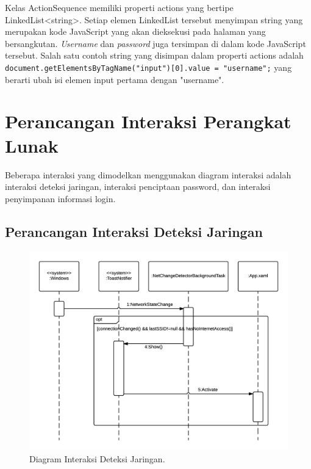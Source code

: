 Kelas ActionSequence memiliki properti actions yang bertipe LinkedList<string>. Setiap elemen LinkedList tersebut menyimpan string yang merupakan kode JavaScript yang akan dieksekusi pada halaman yang bersangkutan. \textit{Username} dan \textit{password} juga tersimpan di dalam kode JavaScript tersebut. Salah satu contoh string yang disimpan dalam properti actions adalah \texttt{document.getElementsByTagName("input")[0].value = "username";} yang berarti ubah isi elemen input pertama dengan "username".


\section{Perancangan Interaksi Perangkat Lunak}
\label{sec:perancangan_interaksi}

Beberapa interaksi yang dimodelkan menggunakan diagram interaksi adalah interaksi deteksi jaringan, interaksi penciptaan password, dan interaksi penyimpanan informasi login.

\subsection{Perancangan Interaksi Deteksi Jaringan}
\label{subsec:perancangan_interaksi_deteksi_jaringan}

\begin{figure}[!htb]
    \centering
    \includegraphics[scale=0.9]{Gambar/SequenceDiagramNetworkDetection.png}
    \caption[Diagram Interaksi Deteksi Jaringan.]{Diagram Interaksi Deteksi Jaringan.} 
    \label{fig:NetworkDetectionSequenceDiagram}
\end{figure}

